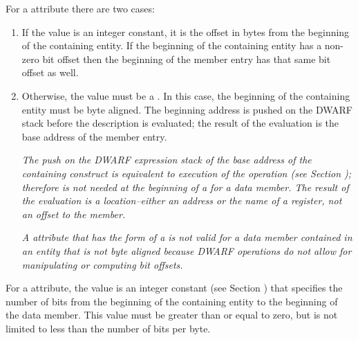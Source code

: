 For a  attribute
there are two cases:

\begin{enumerate}[1.]

\item If the value is an integer constant, it is the offset
in bytes from the beginning of the containing entity. If
the beginning of the containing entity has a non-zero bit
offset then the beginning of the member entry has that same
bit offset as well.

\item Otherwise, the value must be a .
In
this case, the beginning of the containing entity must be byte
aligned. The beginning address is pushed on the DWARF stack
before the  description is evaluated; the result of
the evaluation is the base address of the member entry.

\textit{The push on the DWARF expression stack of the base address of
the containing construct is equivalent to execution of the
 operation 
(see Section );
 therefore 
is not needed at the
beginning of a  for a data member. 
The
result of the evaluation is a location--either an address or
the name of a register, not an offset to the member.}

\textit{A  
attribute 
that has the form of a
 is not valid for a data member contained
in an entity that is not byte aligned because DWARF operations
do not allow for manipulating or computing bit offsets.}

\end{enumerate}

For a  attribute, 
the value is an integer constant 
(see Section ) 
that specifies the number of bits
from the beginning of the containing entity to the beginning
of the data member. This value must be greater than or equal
to zero, but is not limited to less than the number of bits
per byte.

